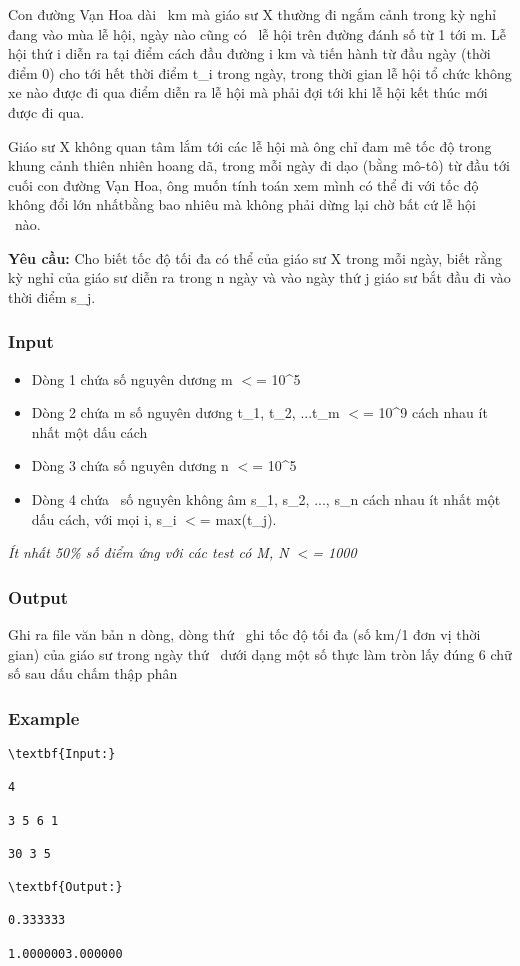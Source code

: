 



   Con đường Vạn Hoa dài                                                    km mà giáo sư X thường đi ngắm cảnh trong kỳ nghỉ đang vào mùa lễ hội, ngày nào cũng có     lễ hội trên đường đánh số từ 1 tới m. Lễ hội thứ i diễn ra tại điểm cách đầu đường i km và tiến hành từ đầu ngày (thời điểm 0) cho tới hết thời điểm t\_i trong ngày, trong thời gian lễ hội tổ chức không xe nào được đi qua điểm diễn ra lễ hội mà phải đợi tới khi lễ hội kết thúc mới được đi qua.  

   Giáo sư X không quan tâm lắm tới các lễ hội mà ông chỉ đam mê tốc độ trong khung cảnh thiên nhiên hoang dã, trong mỗi ngày đi dạo (bằng mô-tô) từ đầu tới cuối con đường Vạn Hoa, ông muốn tính toán xem mình có thể đi với tốc độ không đổi lớn nhấtbằng bao nhiêu mà không phải dừng lại chờ bất cứ lễ hội  nào.  

\textbf{    Yêu cầu:   }   Cho biết tốc độ tối đa có thể của giáo sư X trong mỗi ngày, biết rằng kỳ nghỉ của giáo sư diễn ra trong n ngày và vào ngày thứ j giáo sư bắt đầu đi vào thời điểm s\_j.  

\subsubsection{   Input  }
\begin{itemize}
	\item     Dòng 1 chứa số nguyên dương m $<$= 10\textasciicircum5   
	\item     Dòng 2 chứa m số nguyên dương t\_1, t\_2, ...t\_m $<$= 10\textasciicircum9 cách nhau ít nhất một dấu cách   
	\item     Dòng 3 chứa số nguyên dương n $<$= 10\textasciicircum5   
	\item     Dòng 4 chứa     số nguyên không âm s\_1, s\_2, ..., s\_n cách nhau ít nhất một dấu cách, với mọi i, s\_i $<$= max(t\_j).   
\end{itemize}

\emph{    Ít nhất 50\% số điểm ứng với các test có M, N $<$= 1000   }\emph{}

\subsubsection{   Output  }

   Ghi ra file văn bản n dòng, dòng thứ     ghi tốc độ tối đa (số km/1 đơn vị thời gian) của giáo sư trong ngày thứ     dưới dạng một số thực làm tròn lấy đúng 6 chữ số sau dấu chấm thập phân  

\subsubsection{   Example  }
\begin{verbatim}
\textbf{Input:}

4

3 5 6 1

30 3 5

\textbf{Output:}

0.333333

1.0000003.000000\end{verbatim}